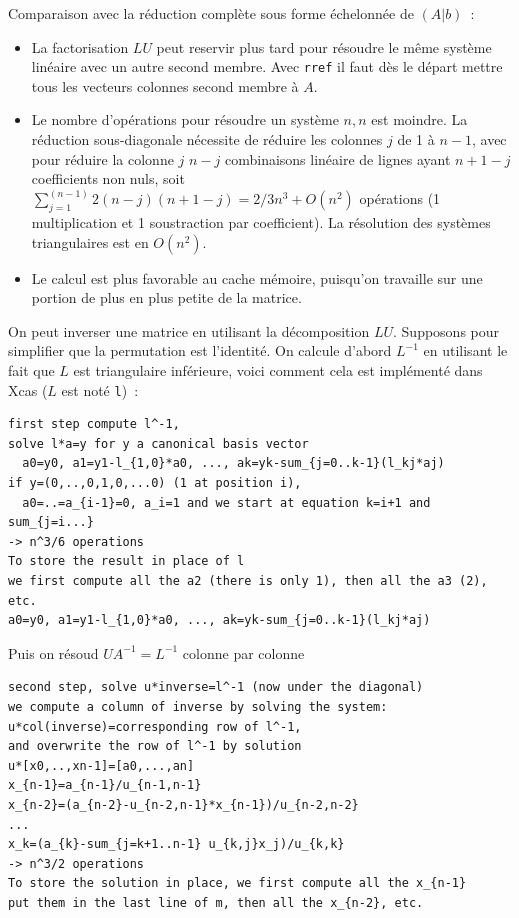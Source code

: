 \documentclass[a4paper,11pt]{article}
\begin{document}
Comparaison avec la r\'eduction compl\`ete sous forme \'echelonn\'ee de
$(A|b)$~:
\begin{itemize}
\item La factorisation $LU$ peut reservir plus tard pour r\'esoudre le m\^eme
syst\`eme lin\'eaire avec un autre second membre.
Avec \verb|rref| il faut d\`es le d\'epart mettre tous les
vecteurs colonnes second membre \`a $A$.
\item Le nombre d'op\'erations pour r\'esoudre un syst\`eme $n,n$
est moindre. La r\'eduction sous-diagonale n\'ecessite de r\'eduire
les colonnes $j$ de 1 \`a $n-1$, avec pour r\'eduire la colonne $j$
$n-j$ combinaisons lin\'eaire de lignes ayant $n+1-j$ coefficients non
nuls, soit $\sum_{j=1}^(n-1) 2(n-j)(n+1-j)=2/3n^3+O(n^2)$ op\'erations
(1 multiplication et 1 soustraction par coefficient).
La r\'esolution des syst\`emes triangulaires est en $O(n^2)$.
\item Le calcul est plus favorable au cache m\'emoire, puisqu'on
  travaille sur une portion de plus en plus petite de la matrice.
\end{itemize}

On peut inverser une matrice en utilisant la d\'ecomposition
$LU$. Supposons pour simplifier que la permutation est l'identit\'e.
On calcule d'abord $L^{-1}$ en utilisant le fait que $L$ est
triangulaire inf\'erieure, voici comment cela est impl\'ement\'e dans
Xcas ($L$ est not\'e {\tt l})~:
\begin{verbatim}
first step compute l^-1, 
solve l*a=y for y a canonical basis vector
  a0=y0, a1=y1-l_{1,0}*a0, ..., ak=yk-sum_{j=0..k-1}(l_kj*aj)
if y=(0,..,0,1,0,...0) (1 at position i), 
  a0=..=a_{i-1}=0, a_i=1 and we start at equation k=i+1 and sum_{j=i...}
-> n^3/6 operations
To store the result in place of l
we first compute all the a2 (there is only 1), then all the a3 (2), etc.
a0=y0, a1=y1-l_{1,0}*a0, ..., ak=yk-sum_{j=0..k-1}(l_kj*aj)
\end{verbatim}
Puis on r\'esoud $U A^{-1}=L^{-1}$ colonne par colonne
\begin{verbatim}
second step, solve u*inverse=l^-1 (now under the diagonal)
we compute a column of inverse by solving the system: 
u*col(inverse)=corresponding row of l^-1, 
and overwrite the row of l^-1 by solution
u*[x0,..,xn-1]=[a0,...,an]
x_{n-1}=a_{n-1}/u_{n-1,n-1}
x_{n-2}=(a_{n-2}-u_{n-2,n-1}*x_{n-1})/u_{n-2,n-2}
...
x_k=(a_{k}-sum_{j=k+1..n-1} u_{k,j}x_j)/u_{k,k}
-> n^3/2 operations
To store the solution in place, we first compute all the x_{n-1}
put them in the last line of m, then all the x_{n-2}, etc.
\end{verbatim}
\end{document}
